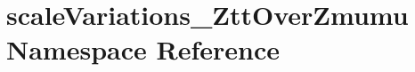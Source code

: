 \hypertarget{namespacescaleVariations__ZttOverZmumu}{
\section{scaleVariations\_\-ZttOverZmumu Namespace Reference}
\label{namespacescaleVariations__ZttOverZmumu}
}
